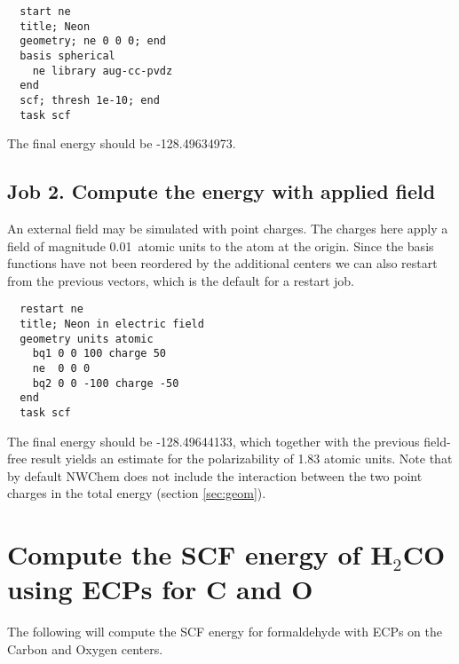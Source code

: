 \begin{verbatim}
  start ne
  title; Neon
  geometry; ne 0 0 0; end
  basis spherical 
    ne library aug-cc-pvdz
  end
  scf; thresh 1e-10; end
  task scf
\end{verbatim}

The final energy should be -128.49634973.

\subsection{Job 2. Compute the energy with applied field}

An external field may be simulated with point charges.  The charges
here apply a field of magnitude 0.01\ atomic units to the atom at the
origin.  Since the basis functions have not been reordered by the
additional centers we can also restart from the previous vectors,
which is the default for a restart job.

\begin{verbatim}
  restart ne
  title; Neon in electric field
  geometry units atomic
    bq1 0 0 100 charge 50
    ne  0 0 0
    bq2 0 0 -100 charge -50
  end
  task scf
\end{verbatim}

The final energy should be -128.49644133, which together with the
previous field-free result yields an estimate for the polarizability
of 1.83 atomic units.  Note that by default NWChem does not include
the interaction between the two point charges in the total energy
(section \ref{sec:geom}).

\section{Compute the SCF energy of H$_2$CO using ECPs for C and O}
\label{sec:sample3}

The following will compute the SCF energy for formaldehyde with ECPs
on the Carbon and Oxygen centers.

